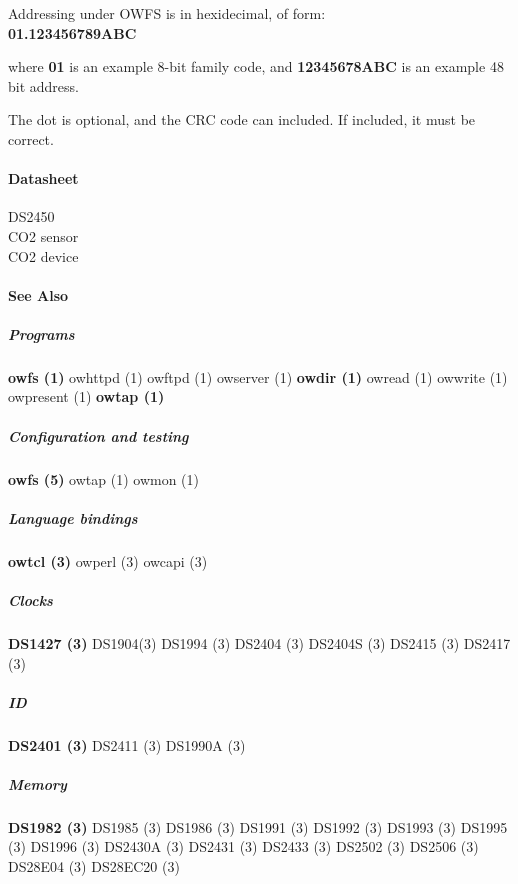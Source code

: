 \begin{description}
\item [Addressing under OWFS is in hexidecimal, of form: ] 
\item [\textbf{01.123456789ABC}
] 
\end{description}


where \textbf{01} is an example 8-bit family code, and \textbf{12345678ABC} is an example
48 bit address. 

The dot is optional, and the CRC code can included. If included,
it must be correct.  
\paragraph*{Datasheet}
\begin{description}
\item [DS2450 ] 

\item [CO2 sensor ]  
\item [CO2 device ] 

\end{description}

\paragraph*{See Also}

\subparagraph*{Programs}\textsf{\textbf{owfs (1)} \textsf{owhttpd (1)} \textsf{owftpd (1)} \textsf{owserver (1)}} \textsf{\textbf{owdir (1)}
\textsf{owread (1)} \textsf{owwrite (1)} \textsf{owpresent (1)}} \textsf{\textbf{owtap (1)}} 
\subparagraph*{Configuration and testing}\textsf{\textbf{owfs
(5)} \textsf{owtap (1)} \textsf{owmon (1)}} 
\subparagraph*{Language bindings}\textsf{\textbf{owtcl (3)} \textsf{owperl (3)} \textsf{owcapi (3)}}

\subparagraph*{Clocks}\textsf{\textbf{DS1427 (3)} \textsf{DS1904(3)} \textsf{DS1994 (3)} \textsf{DS2404 (3)} \textsf{DS2404S (3)} \textsf{DS2415 (3)}
\textsf{DS2417 (3)}} 
\subparagraph*{ID}\textsf{\textbf{DS2401 (3)} \textsf{DS2411 (3)} \textsf{DS1990A (3)}} 
\subparagraph*{Memory}\textsf{\textbf{DS1982 (3)} \textsf{DS1985
(3)} \textsf{DS1986 (3)} \textsf{DS1991 (3)} \textsf{DS1992 (3)} \textsf{DS1993 (3)} \textsf{DS1995 (3)} \textsf{DS1996 (3)} \textsf{DS2430A
(3)} \textsf{DS2431 (3)} \textsf{DS2433 (3)} \textsf{DS2502 (3)} \textsf{DS2506 (3)} \textsf{DS28E04 (3)} \textsf{DS28EC20 (3)}}

